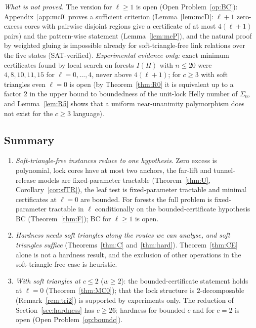 \emph{What is not proved.} The version for $\ell\ge1$ is open (Open Problem~\ref{op:BC}): Appendix~\ref{app:mc0} proves a sufficient criterion (Lemma~\ref{lem:mcD}: $\ell+1$ zero-excess cores with pairwise disjoint regions give a certificate of at most $4(\ell+1)$ pairs) and the pattern-wise statement (Lemma~\ref{lem:mcP}), and the natural proof by weighted gluing is impossible already for soft-triangle-free link relations over the five states (SAT-verified). \emph{Experimental evidence only:} exact minimum certificates found by local search on forests $I(H)$ with $n\le20$ were $4,8,10,11,15$ for $\ell=0,\dots,4$, never above $4(\ell+1)$; for $c\ge3$ with soft triangles even $\ell=0$ is open (by Theorem~\ref{thm:R0} it is equivalent up to a factor $2$ in the upper bound to boundedness of the unit-lock Helly number of $\Sigma_0$, and Lemma~\ref{lem:R5} shows that a uniform near-unanimity polymorphism does not exist for the $c\ge3$ language).

\subsection{Summary}\label{sec:softstatus}
\begin{enumerate}
\item \emph{Soft-triangle-free instances reduce to one hypothesis.} Zero excess is polynomial, lock cores have at most two anchors, the far-lift and tunnel-release models are fixed-parameter tractable (Theorem~\ref{thm:U}, Corollary~\ref{cor:sfTR}), the leaf test is fixed-parameter tractable and minimal certificates at $\ell=0$ are bounded. For forests the full problem is fixed-parameter tractable in $\ell$ conditionally on the bounded-certificate hypothesis BC (Theorem~\ref{thm:F}); BC for $\ell\ge1$ is open.
\item \emph{Hardness needs soft triangles along the routes we can analyse, and soft triangles suffice} (Theorems~\ref{thm:C} and~\ref{thm:hard}). Theorem~\ref{thm:CE} alone is not a hardness result, and the exclusion of other operations in the soft-triangle-free case is heuristic.
\item \emph{With soft triangles at $c\le2$} ($w\ge2$): the bounded-certificate statement holds at $\ell=0$ (Theorem~\ref{thm:MC0}); that the lock structure is $2$-decomposable (Remark~\ref{rem:tri2}) is supported by experiments only. The reduction of Section~\ref{sec:hardness} has $c\ge26$; hardness for bounded $c$ and for $c=2$ is open (Open Problem~\ref{op:boundc}).
\end{enumerate}


